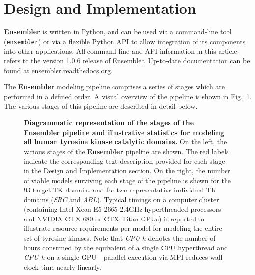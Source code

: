 \documentclass[10pt,letterpaper]{article}
\begin{document}

\section*{Design and Implementation}

{\bf Ensembler} is written in Python, and can be used via a command-line tool ({\tt ensembler}) or via a flexible Python API to allow integration of its components into other applications.
All command-line and API information in this article refers to the \href{https://github.com/choderalab/ensembler/releases/tag/v1.0.6}{version 1.0.6 release of Ensembler}.
Up-to-date documentation can be found at \href{http://ensembler.readthedocs.org/en/latest/}{ensembler.readthedocs.org}.

The {\bf Ensembler} modeling pipeline comprises a series of stages which are performed in a defined order. 
A visual overview of the pipeline is shown in Fig.~\ref{figure:pipeline}.
The various stages of this pipeline are described in detail below.

\begin{figure}[h]

  \caption{{\bf Diagrammatic representation of the stages of the Ensembler pipeline and illustrative statistics for modeling all human tyrosine kinase catalytic domains.}
  On the left, the various stages of the {\bf Ensembler} pipeline are shown.
  The red labels indicate the corresponding text description provided for each stage in the Design and Implementation section.
  On the right, the number of viable models surviving each stage of the pipeline is shown for the 93 target TK domains and for two representative individual TK domains (\emph{SRC} and \emph{ABL}).
  Typical timings on a computer cluster (containing Intel Xeon E5-2665 2.4GHz hyperthreaded processors and NVIDIA GTX-680 or GTX-Titan GPUs) is reported to illustrate resource requirements per model for modeling the entire set of tyrosine kinases.
  Note that \emph{CPU-h} denotes the number of hours consumed by the equivalent of a single CPU hyperthread and \emph{GPU-h} on a single GPU---parallel execution via MPI reduces wall clock time nearly linearly.
  }
  \label{figure:pipeline}
\end{figure}
\end{document}
